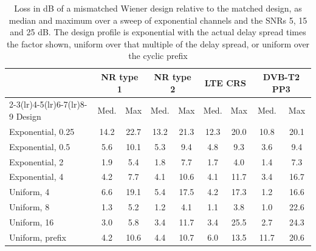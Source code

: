\begin{table}[t]
\caption{Loss in dB of a mismatched Wiener design relative to the matched design, as median and maximum over a sweep of exponential channels and the SNRs 5, 15 and 25 dB. The design profile is exponential with the actual delay spread times the factor shown, uniform over that multiple of the delay spread, or uniform over the cyclic prefix}
\label{tab:mismatch}
\centering
\footnotesize
\setlength{\tabcolsep}{6pt}
\begin{tabular}{l cc cc cc cc}
\toprule
 & \multicolumn{2}{c}{NR type 1} & \multicolumn{2}{c}{NR type 2} & \multicolumn{2}{c}{LTE CRS} & \multicolumn{2}{c}{DVB-T2 PP3} \\
\cmidrule(lr){2-3}\cmidrule(lr){4-5}\cmidrule(lr){6-7}\cmidrule(lr){8-9}
Design & Med. & Max & Med. & Max & Med. & Max & Med. & Max \\
\midrule
Exponential, 0.25 & 14.2 & 22.7 & 13.2 & 21.3 & 12.3 & 20.0 & 10.8 & 20.1 \\
Exponential, 0.5 & 5.6 & 10.1 & 5.3 & 9.4 & 4.8 & 9.3 & 3.6 & 9.4 \\
Exponential, 2 & 1.9 & 5.4 & 1.8 & 7.7 & 1.7 & 4.0 & 1.4 & 7.3 \\
Exponential, 4 & 4.2 & 7.7 & 4.1 & 10.6 & 4.1 & 11.7 & 3.4 & 16.7 \\
Uniform, 4 & 6.6 & 19.1 & 5.4 & 17.5 & 4.2 & 17.3 & 1.2 & 16.6 \\
Uniform, 8 & 1.3 & 5.2 & 1.2 & 4.1 & 1.1 & 3.8 & 1.0 & 22.6 \\
Uniform, 16 & 3.0 & 5.8 & 3.4 & 11.7 & 3.4 & 25.5 & 2.7 & 24.3 \\
Uniform, prefix & 4.2 & 10.6 & 4.4 & 10.7 & 6.0 & 13.5 & 11.7 & 20.6 \\
\bottomrule
\end{tabular}
\end{table}
